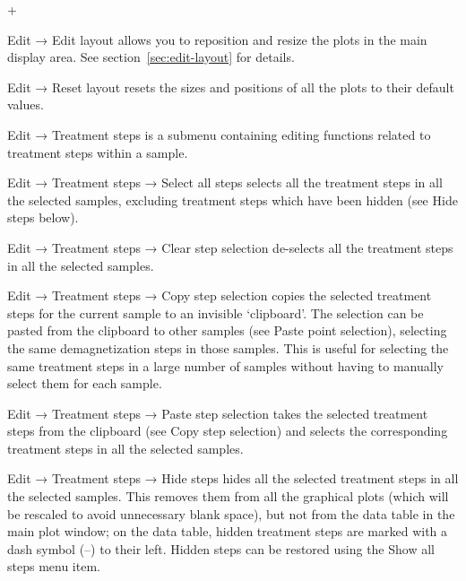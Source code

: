 \documentclass[a4paper,british]{article}
\newcommand{\menuitemlabel}[1]{%
\mbox{\textsf{#1}}\hfil}
\newenvironment{menuitemlist}%
{\begin{list}{}{%
\renewcommand{\makelabel}{\menuitemlabel}%
\setlength{\labelwidth}{35pt}%
\setlength{\leftmargin}%
             {\labelwidth+\labelsep}}}%
{\end{list}}
\newcommand{\ppcmd}[1]{\textsf{#1}} %
\newcommand{\submenu}{ \textrm{→} }
\begin{document}
\begin{menuitemlist}

\item[Edit\submenu Edit layout] allows you to reposition and resize the plots
  in the main display area. See section~\ref{sec:edit-layout} for details.

\item[Edit\submenu Reset layout] resets the sizes and positions of all the
  plots to their default values.

\item[Edit\submenu Treatment steps] is a submenu containing editing
  functions related to treatment steps within a sample.
  
\item[Edit\submenu Treatment steps\submenu Select all steps] selects all
  the treatment steps in all the selected samples, excluding treatment
  steps which have been hidden (see \ppcmd{Hide steps} below).

\item[Edit\submenu Treatment steps\submenu Clear step selection]
  de-selects all the treatment steps in all the selected samples.

\item[Edit\submenu Treatment steps\submenu Copy step selection] copies
  the selected treatment steps for the current sample to an invisible
  `clipboard'. The selection can be pasted from the clipboard to other
  samples (see \ppcmd{Paste point selection}), selecting the same
  demagnetization steps in those samples. This is useful for selecting
  the same treatment steps in a large number of samples without having
  to manually select them for each sample.

\item[Edit\submenu Treatment steps\submenu Paste step selection] takes
  the selected treatment steps from the clipboard (see \ppcmd{Copy step
    selection}) and selects the corresponding treatment steps in all the
  selected samples.

\item[Edit\submenu Treatment steps\submenu Hide steps] hides all the
  selected treatment steps in all the selected samples. This removes
  them from all the graphical plots (which will be rescaled to avoid
  unnecessary blank space), but not from the data table in the main plot
  window; on the data table, hidden treatment steps are marked with a
  dash symbol (--) to their left. Hidden steps can be restored using the
  \ppcmd{Show all steps} menu item.


\end{menuitemlist}
\end{document}
